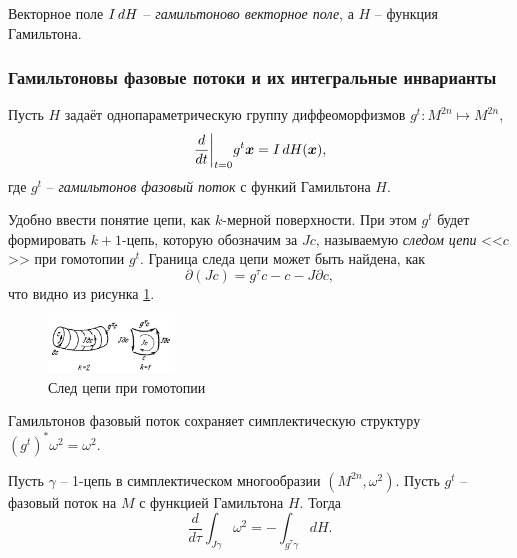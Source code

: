 \begin{to_def}
    Векторное поле $I \, d H$ -- \textit{гамильтоново векторное поле}, а $H$ -- функция Гамильтона. 
\end{to_def}




\subsubsection*{Гамильтоновы фазовые потоки и их интегральные инварианты}

Пусть $H$ задаёт однопараметрическую группу диффеоморфизмов $g^t \colon  M^{2n} \mapsto M^{2n}$,
\begin{equation*}
    \frac{d }{d t} \bigg|_{t=0} g^t \mbox{\boldmath $x$} = I \, d H (\mbox{\boldmath $x$}),
\end{equation*}
где $g^t$ -- \textit{гамильтонов фазовый поток} с функий Гамильтона $H$. 


Удобно ввести понятие цепи, как $k$-мерной поверхности. При этом $g^t$ будет формировать $k+1$-цепь, которую обозначим за $Jc$, называемую \textit{следом цепи} <<$c$>> при гомотопии $g^t$. Граница следа цепи может быть найдена, как 
\begin{equation*}
    \partial (J c) = g^\tau c - c - J \partial c,
\end{equation*}
что видно из рисунка \ref{fig:сhains}.

\begin{figure}[ht]
    \centering
    \includegraphics[width=0.3\textwidth]{imgs/chains.png}
    \caption{След цепи при гомотопии}
    \label{fig:сhains}
\end{figure}




\begin{to_thr}[]
    Гамильтонов фазовый поток сохраняет симплектическую структуру $(g^t)^* \omega^2 = \omega^2$. 
    \label{thrA1}
\end{to_thr}


\begin{to_lem}
    Пусть $\gamma$ -- 1-цепь в симплектическом многообразии $(M^{2n}, \omega^2)$. Пусть $g^t$  -- фазовый поток на $M$ с функцией Гамильтона $H$. Тогда
    \begin{equation*}
        \frac{d }{d \tau} \int_{J \gamma} \omega^2 = - \int_{g^\tau \gamma} d H.
    \end{equation*}
\end{to_lem}

